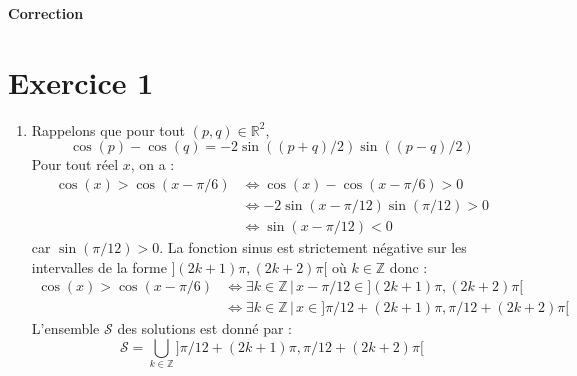 \documentclass[a4paper,twoside,french,10pt]{VcCours}
\begin{document}

\begin{center}
\large\bf
Correction
\end{center}
\separationTitre


\section*{Exercice 1}

\begin{enumerate}
\item Rappelons que pour tout $(p,q) \in \mathbb{R}^2$,
$$ \cos(p)-\cos(q) = -2 \sin((p+q)/2)\sin((p-q)/2)$$
Pour tout réel $x$, on a :
\begin{align*}
 \cos(x) > \cos(x-\pi/6) & \Longleftrightarrow  \cos(x) - \cos(x-\pi/6) >0 \\
 & \Longleftrightarrow  -2 \sin(x-\pi/12) \sin(\pi/12) > 0 \\
 & \Longleftrightarrow \sin(x-\pi/12) < 0 
\end{align*}
car $ \sin(\pi/12) >0$. La fonction sinus est strictement négative sur les intervalles de la forme \newline $](2k+1)\pi,(2k+2) \pi[$ où $k \in \mathbb{Z}$ donc :
\begin{align*}
 \cos(x) > \cos(x-\pi/6) & \Longleftrightarrow \exists k \in \mathbb{Z} \, \vert \, x-\pi/12 \in ](2k+1)\pi,(2k+2) \pi[ \\
 & \Longleftrightarrow \exists k \in \mathbb{Z} \, \vert \, x \in ]\pi/12+(2k+1)\pi,\pi/12+(2k+2) \pi[
\end{align*}
L'ensemble $\mathcal{S}$ des solutions est donné par :
$$\boxed{\mathcal{S} = \bigcup_{k \in \mathbb{Z}}  ]\pi/12+(2k+1)\pi,\pi/12+(2k+2) \pi[}$$

\end{enumerate}
\end{document}

